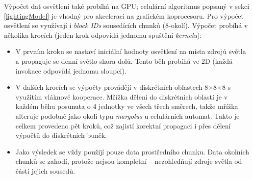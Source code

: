 Výpočet dat osvětlení také probíhá na GPU; celulární algoritmus popsaný v sekci \ref{lightingModel} je vhodný pro akceleraci na grafickém koprocesoru. Pro výpočet osvětlení se využívají i \textit{block IDs} sousedících chunků (8-okolí). Výpočet probíhá v několika krocích (jeden krok odpovídá jednomu spuštění \textit{kernelu}):
\begin{itemize}
	\item V prvním kroku se nastaví iniciální hodnoty osvětlení na místa zdrojů světla a propaguje se denní světlo shora dolů. Tento běh probíhá ve 2D (každá invokace odpovídá jednomu sloupci).
	\item V dalších krocích se výpočty provádějí v diskrétních oblastech 8×8×8 s využitím vláknové kooperace. Mřížka dělení do diskrétních oblastí je v každém běhu posunuta o 4 jednotky ve všech třech směrech, takže mřížka alteruje podobně jako okolí typu \textit{margolus} u celulárních automat. Takto je celkem provedeno pět kroků, což zajistí korektní propagaci i přes dělení výpočtů do diskrétních buněk.
	\item Jako výsledek se vždy použijí pouze data prostředního chunku. Data okolních chunků se zahodí, protože nejsou kompletní -- nezohledňují zdroje světla od části jejich sousedů.
\end{itemize}

